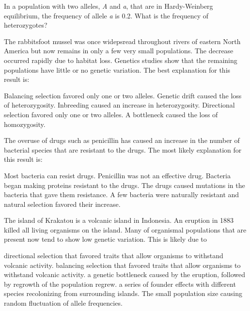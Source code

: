 \question
In a population with two alleles, \textit{A} and \textit{a}, that are in Hardy-Weinberg equilibrium, the frequency of allele \textit{a} is 0.2. What is the frequency of heterozygotes? 

\begin{choices}
\end{choices}

\question
The rabbitsfoot mussel was once widepsread throughout rivers of eastern North America but now remains in only a few very small populations. The decrease occurred rapidly due to habitat loss. Genetics studies show that the remaining populations have little or no genetic variation. The best explanation for this result is:

\begin{choices}
\choice Balancing selection favored only one or two alleles. %
\correctchoice Genetic drift caused the loss of heterozygosity. %
\choice Inbreeding caused an increase in heterozygosity. %
\choice Directional selection favored only one or two alleles. %
\choice A bottleneck caused the loss of homozygosity. %
\end{choices}

\question
The overuse of drugs such as penicillin has caused an increase in the number of bacterial species that are resistant to the drugs. The most likely explanation for this result is:

\begin{choices}
\choice Most bacteria can resist drugs. %
\choice Penicillin was not an effective drug. %
\choice Bacteria began making proteins resistant to the drugs. %
\choice The drugs caused mutations in the bacteria that gave them resistance. %
\correctchoice A few bacteria were naturally resistant and natural selection favored their increase. %
\end{choices}


\question
The island of Krakatou is a volcanic island in Indonesia.  An eruption in 1883 killed all living organisms on the island.  Many of organismal populations that are present now tend to show low genetic variation.  This is likely due to

\begin{choices}
\choice directional selection that favored traits that allow organisms to withstand volcanic activity. %
\choice balancing selection that favored traits that allow organisms to withstand volcanic activity. %
\choice a genetic bottleneck caused by the eruption, followed by regrowth of the population regrew. %
\correctchoice a series of founder effects with different species recolonizing from surrounding islands. %
\choice The small population size causing random fluctuation of allele frequencies. %
\end{choices}

